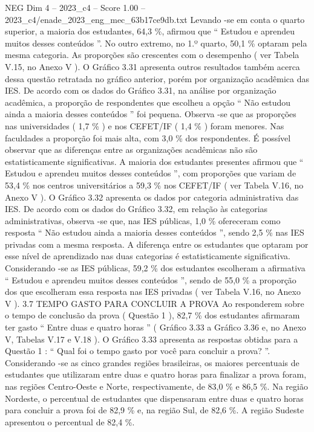 \begin{textsample}{NEG Dim 4 – 2023\_c4 – Score 1.00 – 2023\_c4/enade\_2023\_eng\_mec\_63b17ce9db.txt}
Levando -se em conta o quarto superior, a maioria dos estudantes, 64,3 \%, afirmou que “ Estudou e aprendeu muitos desses conteúdos ”.
No outro extremo, no 1.º quarto, 50,1 \% optaram pela mesma categoria.
As proporções são crescentes com o desempenho ( ver Tabela V.15, no Anexo V ).
O Gráfico 3.31 apresenta outros resultados também acerca dessa questão retratada no gráfico anterior, porém por organização acadêmica das IES.
De acordo com os dados do Gráfico 3.31, na análise por organização acadêmica, a proporção de respondentes que escolheu a opção “ Não estudou ainda a maioria desses conteúdos ” foi pequena.
Observa -se que as proporções nas universidades ( 1,7 \% ) e nos CEFET/IF ( 1,4 \% ) foram menores.
Nas faculdades a proporção foi mais alta, com 3,0 \% dos respondentes.
É possível observar que as diferenças entre as organizações acadêmicas não são estatisticamente significativas.
A maioria dos estudantes presentes afirmou que “ Estudou e aprendeu muitos desses conteúdos ”, com proporções que variam de 53,4 \% nos centros universitários a 59,3 \% nos CEFET/IF ( ver Tabela V.16, no Anexo V ).
O Gráfico 3.32 apresenta os dados por categoria administrativa das IES.
De acordo com os dados do Gráfico 3.32, em relação às categorias administrativas, observa -se que, nas IES públicas, 1,0 \% ofereceram como resposta “ Não estudou ainda a maioria desses conteúdos ”, sendo 2,5 \% nas IES privadas com a mesma resposta.
A diferença entre os estudantes que optaram por esse nível de aprendizado nas duas categorias é estatisticamente significativa.
Considerando -se as IES públicas, 59,2 \% dos estudantes escolheram a afirmativa “ Estudou e aprendeu muitos desses conteúdos ”, sendo de 55,0 \% a proporção dos que escolheram essa resposta nas IES privadas ( ver Tabela V.16, no Anexo V ). 3.7 TEMPO GASTO PARA CONCLUIR A PROVA Ao responderem sobre o tempo de conclusão da prova ( Questão 1 ), 82,7 \% dos estudantes afirmaram ter gasto “ Entre duas e quatro horas ” ( Gráfico 3.33 a Gráfico 3.36 e, no Anexo V, Tabelas V.17 e V.18 ).
O Gráfico 3.33 apresenta as respostas obtidas para a Questão 1 : “ Qual foi o tempo gasto por você para concluir a prova? ”.
Considerando -se as cinco grandes regiões brasileiras, os maiores percentuais de estudantes que utilizaram entre duas e quatro horas para finalizar a prova foram, nas regiões Centro-Oeste e Norte, respectivamente, de 83,0 \% e 86,5 \%.
Na região Nordeste, o percentual de estudantes que dispensaram entre duas e quatro horas para concluir a prova foi de 82,9 \% e, na região Sul, de 82,6 \%.
A região Sudeste apresentou o percentual de 82,4 \%.

\end{textsample}
